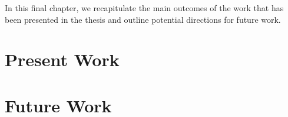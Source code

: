 In this final chapter, we recapitulate the main outcomes of the work that has
been presented in the thesis and outline potential directions for future work.

\section{Present Work}

\section{Future Work}
